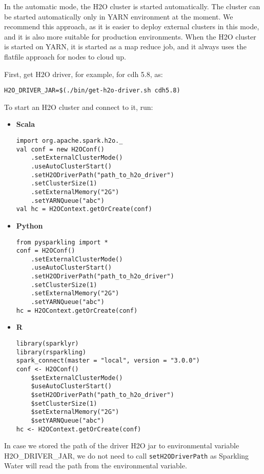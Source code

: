 In the automatic mode, the H2O cluster is started automatically. The cluster can be started automatically only in YARN
environment at the moment. We recommend this approach, as it is easier to deploy external clusters in this mode,
and it is also more suitable for production environments. When the H2O cluster is started on YARN, it is started
as a map reduce job, and it always uses the flatfile approach for nodes to cloud up.

First, get H2O driver, for example, for cdh 5.8, as:

\begin{lstlisting}[style=bash]
H2O_DRIVER_JAR=$(./bin/get-h2o-driver.sh cdh5.8)
\end{lstlisting}


To start an H2O cluster and connect to it, run:

\begin{itemize}
    \item \textbf{Scala} \begin{lstlisting}[style=Scala]
import org.apache.spark.h2o._
val conf = new H2OConf()
    .setExternalClusterMode()
    .useAutoClusterStart()
    .setH2ODriverPath("path_to_h2o_driver")
    .setClusterSize(1)
    .setExternalMemory("2G")
    .setYARNQueue("abc")
val hc = H2OContext.getOrCreate(conf)
    \end{lstlisting}
    \item \textbf{Python} \begin{lstlisting}[style=Python]
from pysparkling import *
conf = H2OConf()
    .setExternalClusterMode()
    .useAutoClusterStart()
    .setH2ODriverPath("path_to_h2o_driver")
    .setClusterSize(1)
    .setExternalMemory("2G")
    .setYARNQueue("abc")
hc = H2OContext.getOrCreate(conf)
    \end{lstlisting}
    \item \textbf{R} \begin{lstlisting}[style=R]
library(sparklyr)
library(rsparkling)
spark_connect(master = "local", version = "3.0.0")
conf <- H2OConf()
    $setExternalClusterMode()
    $useAutoClusterStart()
    $setH2ODriverPath("path_to_h2o_driver")
    $setClusterSize(1)
    $setExternalMemory("2G")
    $setYARNQueue("abc")
hc <- H2OContext.getOrCreate(conf)
    \end{lstlisting}
\end{itemize}

In case we stored the path of the driver H2O jar to environmental variable H2O\_DRIVER\_JAR, we do not need
to call \texttt{setH2ODriverPath} as Sparkling Water will read the path from the environmental variable.

